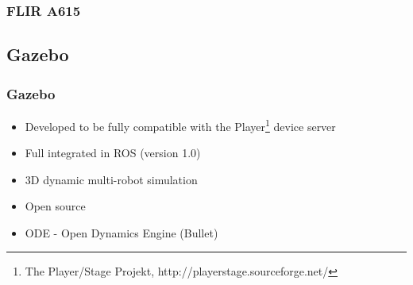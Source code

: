 \begin{frame}
 \frametitle{FLIR A615}
\end{frame}

\subsection{Gazebo} %
\begin{frame}
  \frametitle{Gazebo}
\begin{itemize}
    \item Developed to be fully compatible with the Player\footnote{The Player/Stage Projekt, http://playerstage.sourceforge.net/} device server
    \item Full integrated in ROS (version 1.0)
    \item 3D dynamic multi-robot simulation
    \item Open source
    \item ODE -  Open Dynamics Engine (Bullet)

   
\end{itemize}
\end{frame}

